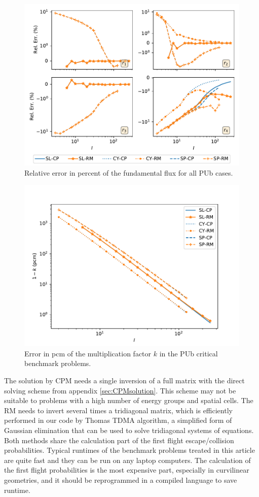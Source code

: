 \documentclass{ictt26}
\begin{document}
\begin{figure}[hp]
\centering
\includegraphics[width=.8\linewidth]{cpm_PUb_flxerr.pdf}
\caption{Relative error in percent of the fundamental flux for all PUb cases.}
\label{fig:cpm_PUb_flxerr}
\end{figure}

\begin{figure}[hp]
\centering
\includegraphics[width=.8\linewidth]{cpm_PUb_kerr.pdf}
\caption{Error in pcm of the multiplication factor $k$ in the PUb critical benchmark problems.}
\label{fig:cpm_PUb_kerr}
\end{figure}

The solution by CPM needs a single inversion of a full matrix with the direct solving scheme from appendix \ref{sec:CPMsolution}. This scheme may not be suitable to problems with a high number of energy groups and spatial cells. The RM needs to invert several times a tridiagonal matrix, which is efficiently performed in our code by Thomas TDMA algorithm, a simplified form of Gaussian elimination that can be used to solve tridiagonal systems of equations. Both methods share the calculation part of the first flight escape/collision probabilities. Typical runtimes of the benchmark problems treated in this article are quite fast and they can be run on any laptop computers. The calculation of the first flight probabilities is the most expensive part, especially in curvilinear geometries, and it should be reprogrammed in a compiled language to save runtime.
\end{document}
